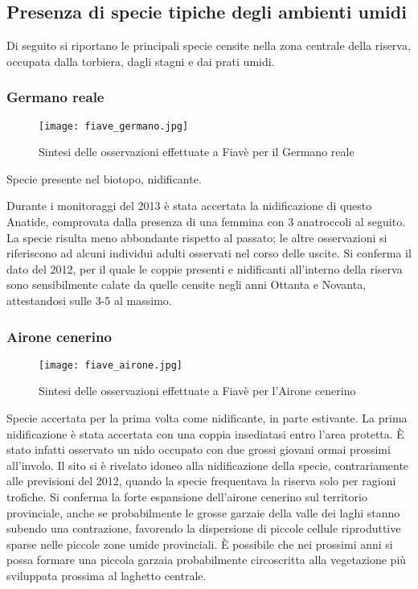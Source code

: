 \documentclass[11pt,a4paper,twoside]{memoir}
\begin{document}
\subsection{Presenza di specie tipiche degli ambienti umidi}
Di seguito si riportano le principali specie censite nella zona centrale della riserva, occupata dalla torbiera, dagli stagni e dai prati umidi. 

\subsubsection{Germano reale}
\vspace*{\fill}
\begin{figure}[H]
  \centering
  \texttt{[image: fiave\_germano.jpg]}
  \caption{Sintesi delle osservazioni effettuate a Fiavè per il Germano reale}
\end{figure}\vspace*{\fill}
Specie presente nel biotopo, nidificante. 

Durante i monitoraggi del 2013 è stata accertata la nidificazione di questo Anatide, comprovata dalla presenza di una femmina con 3 anatroccoli al seguito. 
La specie risulta meno abbondante rispetto al passato; le altre osservazioni si riferiscono ad alcuni individui adulti osservati nel corso delle uscite. Si conferma il dato del 2012, per il quale le coppie presenti e nidificanti all'interno della riserva sono sensibilmente calate da quelle censite negli anni Ottanta e Novanta, attestandosi sulle 3-5 al massimo.

\subsubsection{Airone cenerino}
\vspace*{\fill}
\begin{figure}[H]
  \centering
  \texttt{[image: fiave\_airone.jpg]}
  \caption{Sintesi delle osservazioni effettuate a Fiavè per l'Airone cenerino}
\end{figure}\vspace*{\fill}
Specie accertata per la prima volta come nidificante, in parte estivante. La prima nidificazione è stata accertata con una coppia insediatasi entro l’area protetta. È stato infatti osservato un nido occupato con due grossi giovani ormai prossimi all'involo. Il sito si è rivelato idoneo alla nidificazione della specie, contrariamente alle previsioni del 2012, quando la specie frequentava la riserva solo per ragioni trofiche. Si conferma la forte espansione dell'airone cenerino sul territorio provinciale, anche se probabilmente le grosse garzaie della valle dei laghi stanno subendo una contrazione, favorendo la dispersione di piccole cellule riproduttive sparse nelle piccole zone umide provinciali. È possibile che nei prossimi anni si possa formare una piccola garzaia probabilmente circoscritta alla vegetazione più sviluppata prossima al laghetto centrale.
\end{document}
